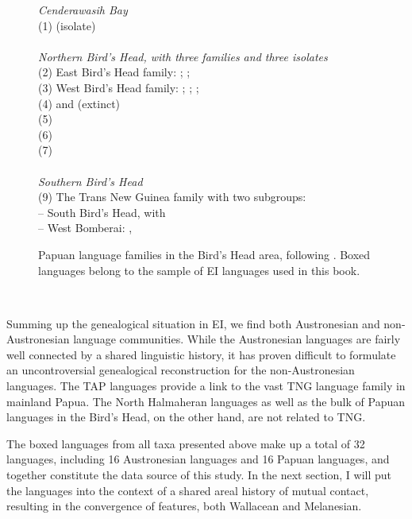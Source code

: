 \begin{figure}[ht]
{\raggedright{}
\begin{footnotesize}
\textit{Cenderawasih Bay} \\
(1)  (isolate) \\
\\
\textit{Northern Bird’s Head, with three families and three isolates} \\
(2) East Bird’s Head family: ; ;  \\
(3) West Bird’s Head family: ; ; ;  \\
(4)  and (extinct)  \\
(5)  \\
(6)  \\
(7)  \\
\\
\textit{Southern Bird’s Head} \\
(9) The Trans New Guinea family with two subgroups: \\
– South Bird’s Head, with  \\
– West Bomberai: ,  \\
\end{footnotesize}
}
\caption[The Papuan languages of the Bird's Head]{Papuan language families in the Bird's Head area, following \citet{klamer2008east}. Boxed languages belong to the sample of EI languages used in this book.}
\end{figure}
\

Summing up the genealogical situation in EI, we find both Austronesian and non-Austronesian language communities. While the Austronesian languages are fairly well connected by a shared linguistic history, it has proven difficult to formulate an uncontroversial genealogical reconstruction for the non-Austronesian languages. The TAP languages provide a link to the vast TNG language family in mainland Papua. The North Halmaheran languages as well as the bulk of Papuan languages in the Bird's Head, on the other hand, are not related to TNG. 

The boxed languages from all taxa presented above make up a total of 32 languages, including 16 Austronesian languages and 16 Papuan languages, and together constitute the data source of this study. In the next section, I will put the languages into the context of a shared areal history of mutual contact, resulting in the convergence of features, both Wallacean and Melanesian.


